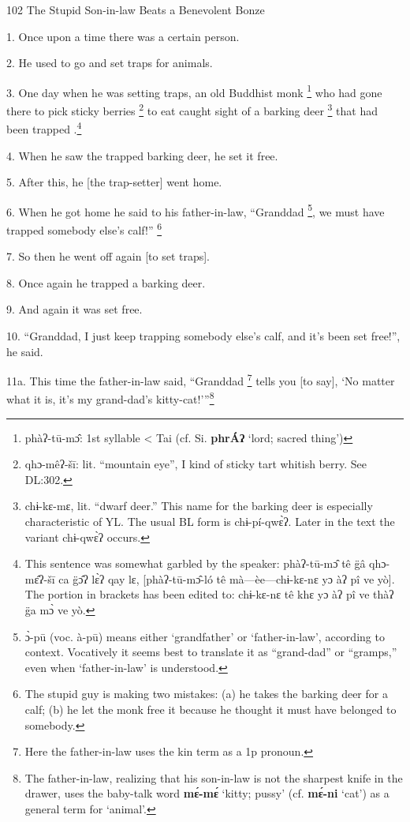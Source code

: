 
102 The Stupid Son-in-law Beats a Benevolent Bonze

1. Once upon a time there was a certain person.

2. He used to go and set traps for animals.

3. One day when he was setting traps, an old Buddhist monk \footnote{phàʔ-tū-mɔ̂: 1st syllable < Tai (cf. Si. \textbf{phrÁʔ} `lord; sacred thing')} who had gone there
to pick sticky berries \footnote{qhɔ-mêʔ-šī: lit. ``mountain eye'', I kind of sticky tart whitish berry. See DL:302.} to eat caught sight of a barking deer \footnote{chɨ-kɛ-mɛ, lit. ``dwarf deer.'' This name for the barking deer is especially characteristic of YL. The usual BL form is chɨ-pí-qwɛ̀ʔ. Later in the text the variant chɨ-qwɛ̀ʔ occurs.} that had been
trapped .\footnote{This sentence was somewhat garbled by the speaker: phàʔ-tū-mɔ̂ tê g̈â qhɔ-mɛ̂ʔ-šī ca g̈ɔ̂ʔ lɛ̀ʔ qay lɛ, [phàʔ-tū-mɔ̂-ló tê mà---èe---chɨ-kɛ-nɛ yɔ àʔ pî ve yò]. The portion in brackets has been edited to: chɨ-kɛ-nɛ tê khɛ yɔ àʔ pî ve thàʔ g̈a mɔ̀ ve yò.}

4. When he saw the trapped barking deer, he set it free.

5. After this, he [the trap-setter] went home.

6. When he got home he said to his father-in-law, ``Granddad \footnote{ɔ̀-pū (voc. à-pū) means either `grandfather' or `father-in-law', according to context. Vocatively it seems best to translate it as ``grand-dad'' or ``gramps,'' even when `father-in-law' is understood.}, we must have
trapped somebody else's calf!'' \footnote{The stupid guy is making two mistakes: (a) he takes the barking deer for a calf; (b) he let the monk free it because he thought it must have belonged to somebody.}

7. So then he went off again [to set traps].

8. Once again he trapped a barking deer.

9. And again it was set free.

10. ``Granddad, I just keep trapping somebody else's calf, and it's been set free!'',
he said.

11a. This time the father-in-law said, ``Granddad \footnote{Here the father-in-law uses the kin term as a 1p pronoun.} tells you [to say], `No matter
what it is, it's my grand-dad's kitty-cat!'''\footnote{The father-in-law, realizing that his son-in-law is not the sharpest knife in the drawer, uses the baby-talk word \textbf{mɛ́-mɛ́} `kitty; pussy' (cf. \textbf{mɛ́-ni} `cat') as a general term for `animal'.}

